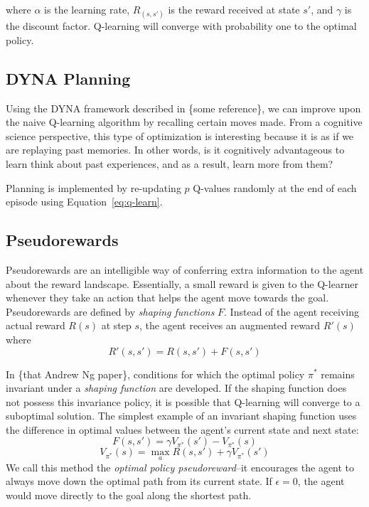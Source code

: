 \documentclass[notitlepage]{report}
\begin{document}
where $\alpha$ is the learning rate, $R_(s, s')$ is the reward received at state $s'$, and $\gamma$ is the discount factor. Q-learning will converge with probability one to the optimal policy. 

\subsection*{DYNA Planning}

Using the DYNA framework described in \{some reference\}, we can improve upon the naive Q-learning algorithm by recalling certain moves made. From a cognitive science perspective, this type of optimization is interesting because it is as if we are replaying past memories. In other words, is it cognitively advantageous to learn think about past experiences, and as a result, learn more from them? 

Planning is implemented by re-updating $p$ Q-values randomly at the end of each episode using Equation~\ref{eq:q-learn}. 

\subsection*{Pseudorewards}

Pseudorewards are an intelligible way of conferring extra information to the agent about the reward landscape. Essentially, a small reward is given to the Q-learner whenever they take an action that helps the agent move towards the goal. Pseudorewards are defined by \textit{shaping functions} $F$. Instead of the agent receiving actual reward $R(s)$ at step $s$, the agent receives an augmented reward $R'(s)$ where
\begin{equation}
R'(s, s') = R(s, s') + F(s, s')
\end{equation} 

 In \{that Andrew Ng paper\}, conditions for which the optimal policy $\pi^*$ remains invariant under a \textit{shaping function} are developed. If the shaping function does not possess this invariance policy, it is possible that Q-learning will converge to a suboptimal solution. The simplest example of an invariant shaping function uses the difference in optimal values between the agent's current state and next state:
\begin{equation}
F(s, s') = \gamma V_{\pi^*}(s') - V_{\pi^*}(s) 
\end{equation}
\begin{equation}
V_{\pi^*}(s) =  \max_{a} R(s, s') + \gamma V_{\pi^*}(s')
\end{equation}
We call this method the \textit{optimal policy pseudoreward}--it encourages the agent to always move down the optimal path from its current state. If $\epsilon = 0$, the agent would move directly to the goal along the shortest path.
\end{document}
